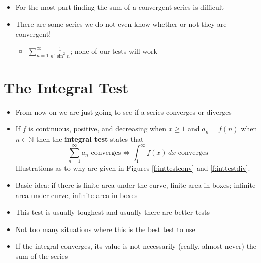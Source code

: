 \documentclass[letterpaper, 11pt, openany]{book}
\theoremstyle{mytheoremstyle}
\theoremstyle{myexamplestyle}
\begin{document}
\begin{itemize}
    \item For the most part finding the sum of a convergent series is difficult
    \item There are some series we do not even know whether or not they are convergent!
    \begin{itemize}
        \item $\displaystyle \sum_{n=1}^{\infty} \frac{1}{n^{3} \sin^{2} n}$; none of our tests will work \faFrown
    \end{itemize}
\end{itemize}

\section{The Integral Test}
\setcounter{figure}{0}

\begin{itemize}
    \item From now on we are just going to see if a series converges or diverges
    \item If $f$ is continuous, positive, and decreasing when $x \geq 1$ and $a_{n} = f(n)$ when $n \in \mathbb{N}$ then the \textbf{integral test} states that
    \[\sum_{n=1}^{\infty} a_{n} \text{ converges} \Leftrightarrow \int_{1}^{\infty} f(x) \, dx \text{ converges}\]
    Illustrations as to why are given in Figures \ref{f:inttestconv} and \ref{f:inttestdiv}.
    \item Basic idea: if there is finite area under the curve, finite area in boxes; infinite area under curve, infinite area in boxes
    \item[{\faExclamationCircle[solid]}] This test is usually toughest and usually there are better tests
    \item Not too many situations where this is the best test to use
    \item [{\faExclamationTriangle[solid]}] If the integral converges, its value is not necessarily (really, almost never) the sum of the series
\end{itemize}
\end{document}
